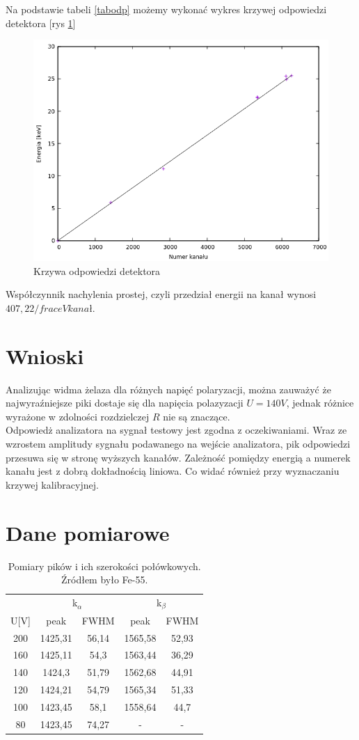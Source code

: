 \documentclass[11pt,a4paper]{article}
\begin{document}
Na podstawie tabeli \ref{tabodp} możemy wykonać wykres krzywej odpowiedzi detektora [rys \ref{krzywaodp}]
\begin{figure}[H]
\centering
\includegraphics[width=.7\linewidth]{krzywaodp.png}
\caption{Krzywa odpowiedzi detektora}
\label{krzywaodp}
\end{figure}
Współczynnik nachylenia prostej, czyli przedział energii na kanał wynosi $407,22/frac{eV}{kanał}$.
\section{Wnioski}
Analizując widma żelaza dla różnych napięć polaryzacji, można zauważyć że najwyraźniejsze piki dostaje się dla napięcia polazyzacji $U=140V$, jednak różnice wyrażone w zdolności rozdzielczej $R$ nie są znaczące.\\
Odpowiedż analizatora na sygnał testowy jest zgodna z oczekiwaniami. Wraz ze wzrostem amplitudy sygnału podawanego na wejście analizatora, pik odpowiedzi przesuwa się w stronę wyższych kanałów. Zależność pomiędzy energią a numerek kanału jest z dobrą dokładnością liniowa. Co widać również przy wyznaczaniu krzywej kalibracyjnej.
\section{Dane pomiarowe}

\begin{longtable}{c|cc|cc}
	\caption{Pomiary pików i ich szerokości połówkowych. Źródłem było Fe-55.}\\
\label{dt2}
 &\multicolumn{2}{c|}{k$_{\alpha}$}	&\multicolumn{2}{c}{k$_{\beta}$} \\
U[V]	&peak	&FWHM	&peak	&FWHM\\ \hline
\endhead
200	&1425,31	&56,14	&1565,58	&52,93 \\
160	&1425,11	&54,3	&1563,44	&36,29 \\
140	&1424,3		&51,79	&1562,68	&44,91 \\
120	&1424,21	&54,79	&1565,34	&51,33 \\
100	&1423,45	&58,1	&1558,64	&44,7 \\
80	&1423,45	&74,27	&-	&- \\
\end{longtable}
\end{document}
